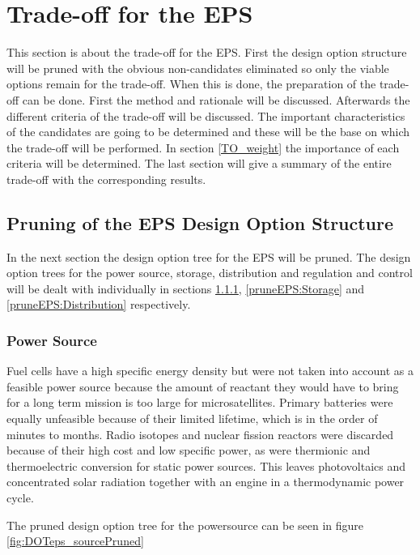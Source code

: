 \section{Trade-off for the \acl{EPS}}
\label{TO_EPS}
This section is about the trade-off for the \ac{EPS}. First the design option structure will be pruned
with the obvious non-candidates eliminated so only the viable options remain for the trade-off.
When this is done, the preparation of the trade-off can be done. First the method and rationale will be discussed.
Afterwards the different criteria of the trade-off will be discussed. The important characteristics of the candidates are going to be
determined and these will be the base on which the trade-off will be performed. In section \ref{TO_weight} the importance of each criteria
will be determined. The last section will give a summary of the entire trade-off with the corresponding results.

\subsection{Pruning of the EPS Design Option Structure}
\label{pruneEPS}
In the next section the design option tree for the \ac{EPS} will be pruned. The design option trees for the power source, storage, distribution and regulation and control will be dealt with individually in sections \ref{pruneEPS:Source}, \ref{pruneEPS:Storage} and \ref{pruneEPS:Distribution} respectively.

\subsubsection{Power Source}
\label{pruneEPS:Source}
Fuel cells have a high specific energy density but were not taken into account as a feasible power source because the amount of reactant they would have to bring for a long term mission is too large for microsatellites. Primary batteries were equally unfeasible because of their limited lifetime, which is in the order of minutes to months. Radio isotopes and nuclear fission reactors were discarded because of their high cost and low specific power, as were thermionic and thermoelectric conversion for static power sources.
This leaves photovoltaics and concentrated solar radiation together with an engine in a thermodynamic power cycle.

The pruned design option tree for the powersource can be seen in figure \ref{fig:DOTeps_sourcePruned}

